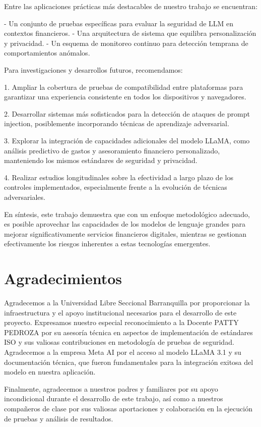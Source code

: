 \documentclass[12pt]{article}
\begin{document}
Entre las aplicaciones prácticas más destacables de nuestro trabajo se encuentran:

- Un conjunto de pruebas específicas para evaluar la seguridad de LLM en contextos financieros.
- Una arquitectura de sistema que equilibra personalización y privacidad.
- Un esquema de monitoreo continuo para detección temprana de comportamientos anómalos.

Para investigaciones y desarrollos futuros, recomendamos:

1. Ampliar la cobertura de pruebas de compatibilidad entre plataformas para garantizar una experiencia consistente en todos los dispositivos y navegadores.

2. Desarrollar sistemas más sofisticados para la detección de ataques de prompt injection, posiblemente incorporando técnicas de aprendizaje adversarial.

3. Explorar la integración de capacidades adicionales del modelo LLaMA, como análisis predictivo de gastos y asesoramiento financiero personalizado, manteniendo los mismos estándares de seguridad y privacidad.

4. Realizar estudios longitudinales sobre la efectividad a largo plazo de los controles implementados, especialmente frente a la evolución de técnicas adversariales.

En síntesis, este trabajo demuestra que con un enfoque metodológico adecuado, es posible aprovechar las capacidades de los modelos de lenguaje grandes para mejorar significativamente servicios financieros digitales, mientras se gestionan efectivamente los riesgos inherentes a estas tecnologías emergentes.

\section{Agradecimientos}
Agradecemos a la Universidad Libre Seccional Barranquilla por proporcionar la infraestructura y el apoyo institucional necesarios para el desarrollo de este proyecto. Expresamos nuestro especial reconocimiento a la Docente PATTY PEDROZA por su asesoría técnica en aspectos de implementación de estándares ISO y sus valiosas contribuciones en metodología de pruebas de seguridad. 
Agradecemos a la empresa Meta AI por el acceso al modelo LLaMA 3.1 y su documentación técnica, que fueron fundamentales para la integración exitosa del modelo en nuestra aplicación. 

Finalmente, agradecemos a nuestros padres y familiares por su apoyo incondicional durante el desarrollo de este trabajo, así como a nuestros compañeros de clase por sus valiosas aportaciones y colaboración en la ejecución de pruebas y análisis de resultados.
\end{document}
